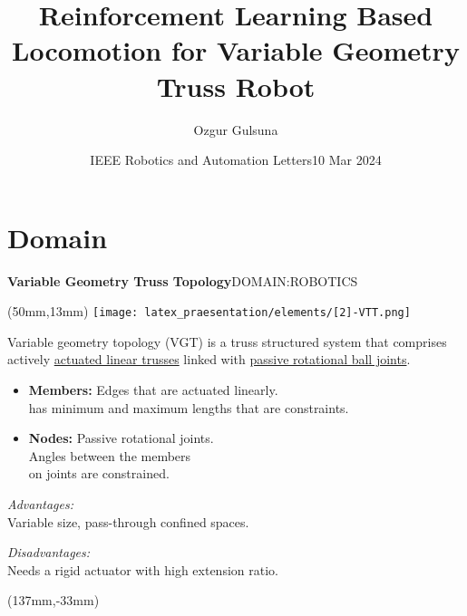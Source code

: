 \documentclass[11pt,aspectratio=169]{beamer}
\title{Reinforcement Learning Based Locomotion for Variable Geometry Truss Robot }
\date[ABC 2021]{IEEE Robotics and Automation Letters}
\author{\fontsize{10}{13}\selectfont Ozgur Gulsuna}
\institute{\textbf{MMI706} \\ Reinforcement Learning}
\begin{document}

\def\mydate{10 Mar 2024}
\date{\mydate}


\titleframe


\section{Domain}

\begin{frame}[fragile]{\textbf{Variable Geometry Truss Topology}\hfill \fontsize{8}{8}\selectfont DOMAIN:ROBOTICS}
    
        \begin{textblock*}{5cm}(50mm,13mm) %
        \texttt{[image: latex\_praesentation/elements/[2]-VTT.png]}
        \end{textblock*}

        Variable geometry topology (VGT) is a truss structured system that comprises actively \uline{actuated linear trusses} linked with \uline{passive rotational ball joints}.

        \medskip
        
        \begin{itemize}
            \item \textbf{Members:} Edges that are actuated linearly. \\
            has minimum and maximum lengths that are constraints.
            \item \textbf{Nodes:} Passive rotational joints. \\
            Angles between the members \\
            on joints are constrained.
        \end{itemize}

        \bigskip
        \bigskip
        \medskip
        
        \emph{Advantages:} \\
        Variable size, pass-through confined spaces.

        \medskip

        \emph{Disadvantages:} \\
        Needs a rigid actuator with high extension ratio.
 	
        \medskip

        \begin{textblock*}{5cm}(137mm,-33mm) %
        {\tiny \cite{10.1016/S0168-874X(99)00041-4}}
        \end{textblock*}
 
\end{frame}
\end{document}
